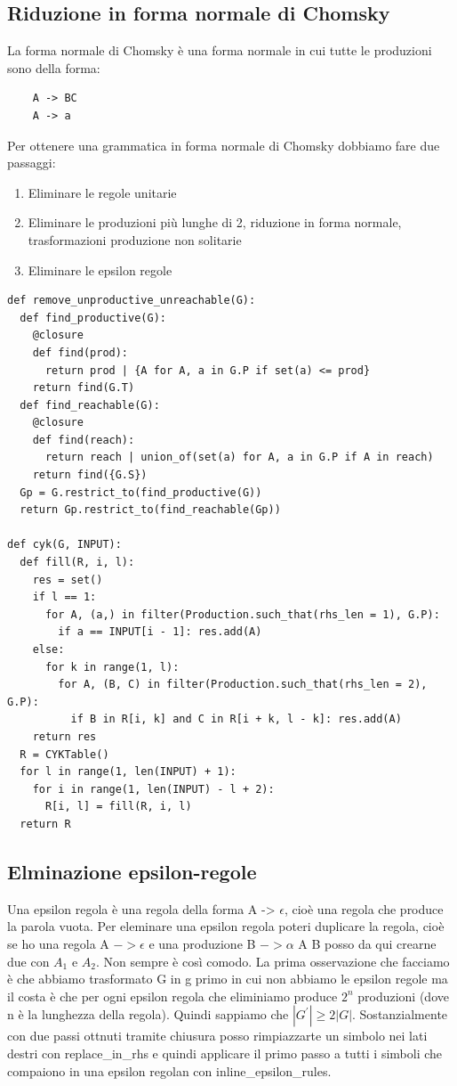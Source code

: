 \subsection{Riduzione in forma normale di Chomsky}
La forma normale di Chomsky è una forma normale in cui tutte le produzioni sono della forma:
\begin{lstlisting}
    A -> BC
    A -> a
\end{lstlisting}

Per ottenere una grammatica in forma normale di Chomsky dobbiamo fare due passaggi:
\begin{enumerate}
    \item Eliminare le regole unitarie
    \item Eliminare le produzioni più lunghe di 2, riduzione in forma normale, trasformazioni produzione non solitarie
    \item Eliminare le epsilon regole
\end{enumerate}

\begin{lstlisting}
def remove_unproductive_unreachable(G):
  def find_productive(G):
    @closure
    def find(prod):
      return prod | {A for A, a in G.P if set(a) <= prod}
    return find(G.T)
  def find_reachable(G):
    @closure
    def find(reach):
      return reach | union_of(set(a) for A, a in G.P if A in reach)
    return find({G.S})
  Gp = G.restrict_to(find_productive(G))
  return Gp.restrict_to(find_reachable(Gp))

def cyk(G, INPUT):
  def fill(R, i, l):
    res = set()
    if l == 1:
      for A, (a,) in filter(Production.such_that(rhs_len = 1), G.P): 
        if a == INPUT[i - 1]: res.add(A)
    else:
      for k in range(1, l):
        for A, (B, C) in filter(Production.such_that(rhs_len = 2), G.P):
          if B in R[i, k] and C in R[i + k, l - k]: res.add(A)
    return res
  R = CYKTable()
  for l in range(1, len(INPUT) + 1):
    for i in range(1, len(INPUT) - l + 2):
      R[i, l] = fill(R, i, l)
  return R
\end{lstlisting}


\subsection{Elminazione epsilon-regole}
Una epsilon regola è una regola della forma A -> $\epsilon$, cioè una regola che produce la parola vuota.
Per eleminare una epsilon regola poteri duplicare la regola, cioè se ho una regola A $ -> \epsilon$ e una produzione B $-> \alpha$ A B posso da qui crearne due con $A_1$ e $A_2$. Non sempre è così comodo. La prima osservazione che facciamo è che abbiamo trasformato G in g primo in cui non abbiamo le epsilon regole ma il costa è che per ogni epsilon regola che eliminiamo produce $2^n$ produzioni (dove n è la lunghezza della regola). Quindi sappiamo che $|G^{'}| \ge 2|G|$.
Sostanzialmente con due passi ottnuti tramite chiusura posso rimpiazzarte un simbolo nei lati destri con replace\_in\_rhs e quindi applicare il primo passo a tutti i simboli che compaiono in una epsilon regolan con inline\_epsilon\_rules.

